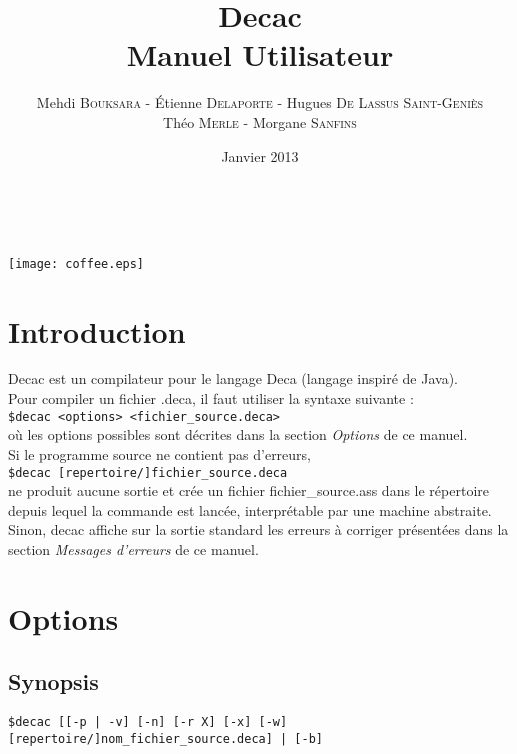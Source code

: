 \documentclass[12pt]{article}
\title{\textbf{Decac\\
  Manuel Utilisateur}}
\author{Mehdi \textsc{Bouksara} - Étienne \textsc{Delaporte} - Hugues \textsc{De Lassus Saint-Geniès} \\
  Théo \textsc{Merle} - Morgane \textsc{Sanfins}}
\date{Janvier 2013}
\begin{document}
\maketitle
~\\
\begin{center}
\texttt{[image: coffee.eps]}
\end{center}

\newpage
\section{Introduction}

Decac est un compilateur pour le langage Deca (langage inspiré de Java).\\
Pour compiler un fichier .deca, il faut utiliser la syntaxe suivante :\\
\lstinline{$decac <options> <fichier_source.deca>}\\%
où les options possibles sont décrites dans la section \textit{Options} de ce manuel.\\

Si le programme source ne contient pas d'erreurs,\\
\lstinline{$decac [repertoire/]fichier_source.deca}\\ %
ne produit aucune sortie et crée un fichier fichier\_source.ass dans le
répertoire depuis lequel la commande est lancée, interprétable par une machine
abstraite.\\
Sinon, decac affiche sur la sortie standard les erreurs à corriger présentées 
dans la section \textit{Messages d'erreurs} de ce manuel.



\section{Options}

\subsection{Synopsis}
\lstinline{$decac [[-p | -v] [-n] [-r X] [-x] [-w] [repertoire/]nom_fichier_source.deca] | [-b]}\\ %
\end{document}
